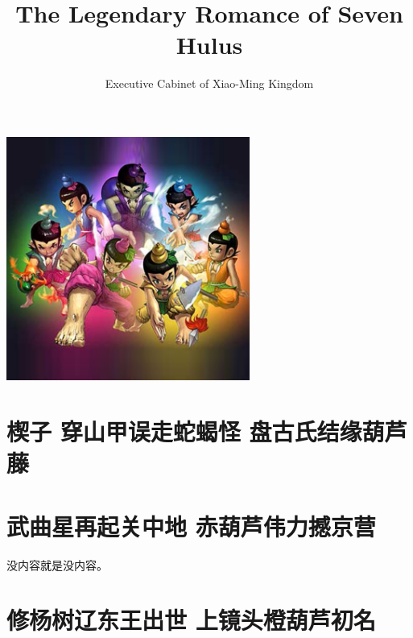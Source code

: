 \documentclass[12pt, a4paper]{book}
\title{\textbf{The Legendary Romance of Seven Hulus}}
\author{Executive Cabinet of Xiao-Ming Kingdom}
\begin{document}
\begin{CJK}{UTF8}{gbsn}

    \maketitle
    \clearpage
    \thispagestyle{empty}

    \frontmatter
    
    \vspace*{50 mm}
    \begin{center}
    \includegraphics[width=0.6\textwidth]{figure/hulu.png}
    \end{center}

    
    

    \chapter{楔子  穿山甲误走蛇蝎怪 盘古氏结缘葫芦藤}
    
    \tableofcontents

    \mainmatter


    \chapter{武曲星再起关中地 赤葫芦伟力撼京营}
    
    没内容就是没内容。

    \chapter{修杨树辽东王出世 上镜头橙葫芦初名}
    

\end{CJK}
\end{document}
